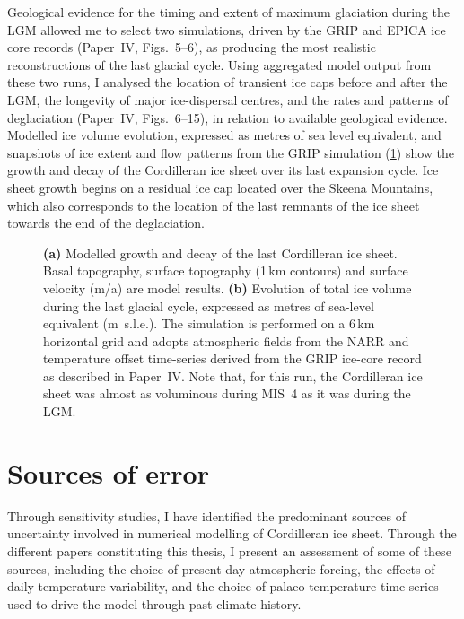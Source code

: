 \documentclass{article}
\newcommand{\CCYC}[0]{Paper~IV}     %
\begin{document}
Geological evidence for the timing and extent of maximum glaciation during the
LGM allowed me to select two simulations, driven by the GRIP
\citep{Dansgaard.etal.1993} and EPICA \citep{Jouzel.etal.2007} ice core records
(\CCYC, Figs.~5--6), as producing the most realistic reconstructions of the
last glacial cycle. Using aggregated model output from these two runs, I
analysed the location of transient ice caps before and after the LGM, the
longevity of major ice-dispersal centres, and the rates and patterns of
deglaciation (\CCYC, Figs.~6--15), in relation to available geological
evidence. Modelled ice volume evolution, expressed as metres of sea level
equivalent, and snapshots of ice extent and flow patterns from the GRIP
simulation (\cref{fig:plot-snapshots}) show the growth and decay of the
Cordilleran ice sheet over its last expansion cycle. Ice sheet growth begins on
a residual ice cap located over the Skeena Mountains, which also corresponds
to the location of the last remnants of the ice sheet towards the end of the
deglaciation.

\begin{figure}
  \centering
  \caption{\textbf{(a)} Modelled growth and decay of the last Cordilleran ice
           sheet. Basal topography, surface topography (1\,km contours) and
           surface velocity (m/a) are model results.
           \textbf{(b)} Evolution of total ice volume during the last glacial
           cycle, expressed as metres of sea-level equivalent (m~s.l.e.). The
           simulation is performed on a 6\,km horizontal grid and adopts
           atmospheric fields from the NARR \citep{Mesinger.etal.2006} and
           temperature offset time-series derived from the GRIP ice-core record
           \citep{Dansgaard.etal.1993} as described in \CCYC. Note that, for
           this run, the Cordilleran ice sheet was almost as voluminous during
           MIS~4 as it was during the LGM.}
  \label{fig:plot-snapshots}
\end{figure}


\section{Sources of error}

Through sensitivity studies, I have identified the predominant sources of
uncertainty involved in numerical modelling of Cordilleran ice sheet. Through
the different papers constituting this thesis, I present an assessment of some
of these sources, including the choice of present-day atmospheric forcing, the
effects of daily temperature variability, and the choice of palaeo-temperature
time series used to drive the model through past climate history.
\end{document}
